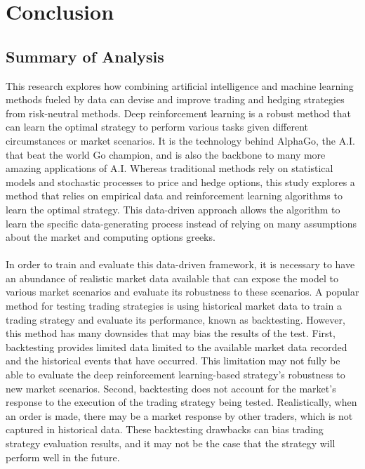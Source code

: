 \chapter{Conclusion}
\section{Summary of Analysis}
This research explores how combining artificial intelligence and machine learning methods fueled by data can devise and improve trading and hedging strategies from risk-neutral methods. Deep reinforcement learning is a robust method that can learn the optimal strategy to perform various tasks given different circumstances or market scenarios. It is the technology behind AlphaGo, the A.I. that beat the world Go champion, and is also the backbone to many more amazing applications of A.I. Whereas traditional methods rely on statistical models and stochastic processes to price and hedge options, this study explores a method that relies on empirical data and reinforcement learning algorithms to learn the optimal strategy. This data-driven approach allows the algorithm to learn the specific data-generating process instead of relying on many assumptions about the market and computing options greeks.
\\ \\
In order to train and evaluate this data-driven framework, it is necessary to have an abundance of realistic market data available that can expose the model to various market scenarios and evaluate its robustness to these scenarios. A popular method for testing trading strategies is using historical market data to train a trading strategy and evaluate its performance, known as backtesting. However, this method has many downsides that may bias the results of the test. First, backtesting provides limited data limited to the available market data recorded and the historical events that have occurred. This limitation may not fully be able to evaluate the deep reinforcement learning-based strategy's robustness to new market scenarios. Second, backtesting does not account for the market's response to the execution of the trading strategy being tested. Realistically, when an order is made, there may be a market response by other traders, which is not captured in historical data. These backtesting drawbacks can bias trading strategy evaluation results, and it may not be the case that the strategy will perform well in the future.
